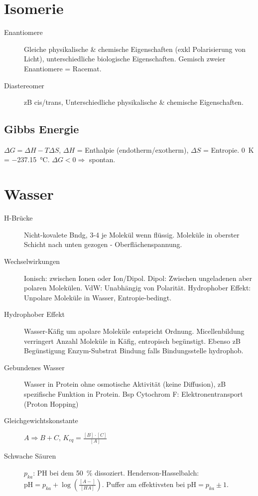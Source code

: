 \documentclass[a4paper,twocolumn,usegeometry,english,fontsize=6,DIV=16]{scrartcl}
\begin{document}
\section{Isomerie}

\begin{description}
	\item[Enantiomere] Gleiche physikalische \& chemische Eigenschaften
		(exkl Polarisierung von Licht), unterschiedliche biologische
		Eigenschaften. Gemisch zweier Enantiomere = Racemat.
	\item[Diastereomer] zB cis/trans, Unterschiedliche physikalische \&
		chemische Eigenschaften.
\end{description}

\subsection{Gibbs Energie}

$\Delta G = \Delta H - T \Delta S$, $\Delta H$ = Enthalpie
(endotherm/exotherm), $\Delta S$ = Entropie. \SI{0}{\kelvin} =
\SI{-237.15}{\celsius}. $\Delta G < 0 \Rightarrow$ spontan.

\section{Wasser}

\begin{description}
	\item[H-Brücke] Nicht-kovalete Bndg, 3-4 je  Molekül wenn
		flüssig. Moleküle in oberster Schicht nach unten gezogen -
		Oberflächenspannung.
	\item[Wechselwirkungen] Ionisch: zwischen Ionen oder Ion/Dipol. Dipol:
		Zwischen ungeladenen aber polaren Molekülen. VdW: Unabhängig
		von Polarität. Hydrophober Effekt: Unpolare Moleküle in Wasser,
		Entropie-bedingt.
	\item[Hydrophober Effekt] Wasser-Käfig um apolare Moleküle entspricht
		Ordnung. Micellenbildung verringert Anzahl Moleküle in Käfig,
		entropisch begünstigt. Ebenso zB Begünstigung Enzym-Substrat
		Bindung falls Bindungsstelle hydrophob.
	\item[Gebundenes Wasser] Wasser in Protein ohne osmotische Aktivität
		(keine Diffusion), zB spezifische Funktion in Protein. Bsp
		Cytochrom F: Elektronentransport (Proton Hopping)
	\item[Gleichgewichtskonstante] $A \Rightarrow B + C$, $K_{eq} =
		\frac{[B] \cdot [C]}{[A]}$
	\item[Schwache Säuren]  $p_{ka}$: PH bei dem \SI{50}{\percent}
		dissoziert. Henderson-Hasselbalch: $\text{pH} = p_{ka} +
		\log\left(\frac{[A-]}{[HA]}\right)$. Puffer am effektivsten bei
		$\text{pH} = p_{ka} \pm 1$.
\end{description}
\end{document}
